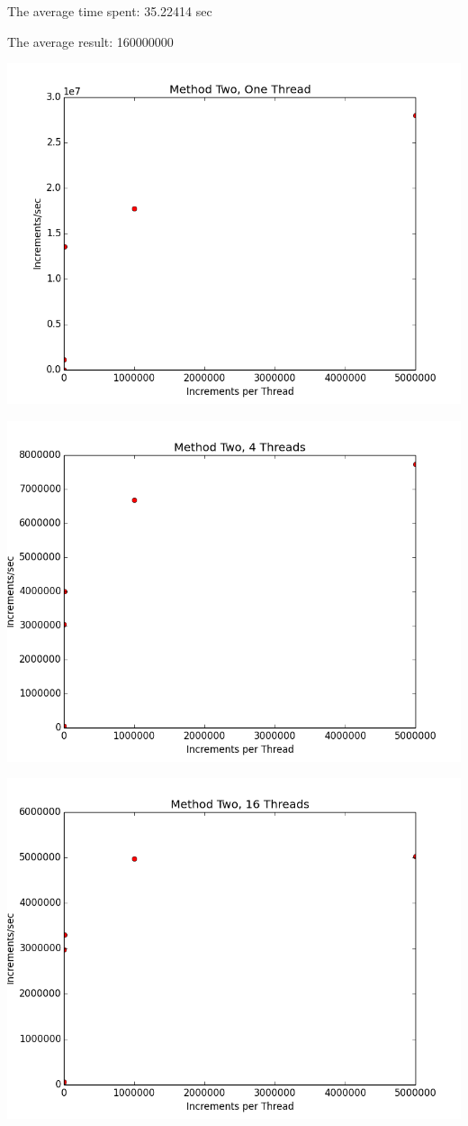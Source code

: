 \documentclass[12pt]{article}
\begin{document}
The average time spent: 35.22414 sec

The average result: 160000000

\includegraphics[scale=.5]{Graphs/MethodTwo_1Thread.png}

\includegraphics[scale=.5]{Graphs/MethodTwo_4Thread.png}

\includegraphics[scale=.5]{Graphs/MethodTwo_16Thread.png}
\end{document}
